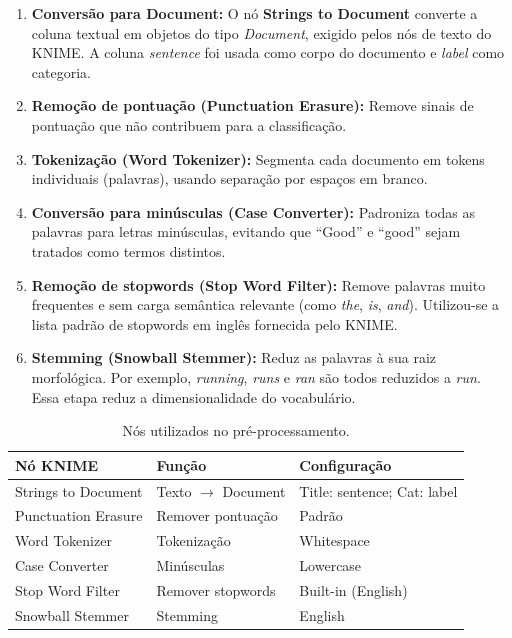 \documentclass[12pt,a4paper]{article}
\begin{document}
\begin{enumerate}[leftmargin=*, label=\textbf{\arabic*.}]
    \item \textbf{Conversão para Document:} O nó \textbf{Strings to Document} converte a coluna textual em objetos do tipo \textit{Document}, exigido pelos nós de texto do KNIME. A coluna \textit{sentence} foi usada como corpo do documento e \textit{label} como categoria.

    \item \textbf{Remoção de pontuação (Punctuation Erasure):} Remove sinais de pontuação que não contribuem para a classificação.

    \item \textbf{Tokenização (Word Tokenizer):} Segmenta cada documento em tokens individuais (palavras), usando separação por espaços em branco.

    \item \textbf{Conversão para minúsculas (Case Converter):} Padroniza todas as palavras para letras minúsculas, evitando que ``Good'' e ``good'' sejam tratados como termos distintos.

    \item \textbf{Remoção de stopwords (Stop Word Filter):} Remove palavras muito frequentes e sem carga semântica relevante (como \textit{the}, \textit{is}, \textit{and}). Utilizou-se a lista padrão de stopwords em inglês fornecida pelo KNIME.

    \item \textbf{Stemming (Snowball Stemmer):} Reduz as palavras à sua raiz morfológica. Por exemplo, \textit{running}, \textit{runs} e \textit{ran} são todos reduzidos a \textit{run}. Essa etapa reduz a dimensionalidade do vocabulário.
\end{enumerate}

\begin{table}[H]
\centering
\caption{Nós utilizados no pré-processamento.}
\label{tab:nos-preproc}
\begin{tabular}{lll}
\toprule
\textbf{Nó KNIME} & \textbf{Função} & \textbf{Configuração} \\
\midrule
Strings to Document & Texto $\rightarrow$ Document & Title: sentence; Cat: label \\
Punctuation Erasure & Remover pontuação & Padrão \\
Word Tokenizer & Tokenização & Whitespace \\
Case Converter & Minúsculas & Lowercase \\
Stop Word Filter & Remover stopwords & Built-in (English) \\
Snowball Stemmer & Stemming & English \\
\bottomrule
\end{tabular}
\end{table}
\end{document}
